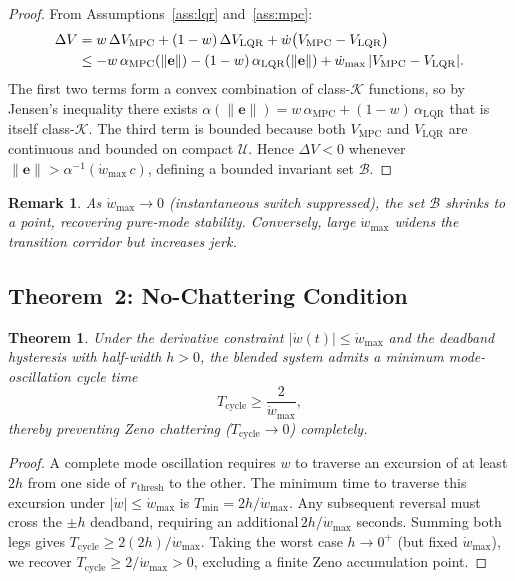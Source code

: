 \documentclass[journal]{IEEEtran}
\newtheorem{theorem}{Theorem}
\newtheorem{remark}{Remark}
\begin{document}
\begin{proof}
  From Assumptions~\ref{ass:lqr} and~\ref{ass:mpc}:
  \begin{align}
    \Delta V &= w\,\Delta V_{\mathrm{MPC}} + (1-w)\,\Delta V_{\mathrm{LQR}}
               + \dot{w}\bigl(V_{\mathrm{MPC}} - V_{\mathrm{LQR}}\bigr)\notag\\
             &\leq -w\,\alpha_{\mathrm{MPC}}(\|\mathbf{e}\|)
                  -(1-w)\,\alpha_{\mathrm{LQR}}(\|\mathbf{e}\|)
                  + \dot{w}_{\max}\,|V_{\mathrm{MPC}} - V_{\mathrm{LQR}}|.
                  \label{eq:lyapunov_bound}
  \end{align}
  The first two terms form a convex combination of class-\(\mathcal{K}\)
  functions, so by Jensen's inequality there exists
  \(\alpha(\|\mathbf{e}\|) = w\,\alpha_{\mathrm{MPC}} + (1-w)\,\alpha_{\mathrm{LQR}}\)
  that is itself class-\(\mathcal{K}\).
  The third term is bounded because both \(V_{\mathrm{MPC}}\) and
  \(V_{\mathrm{LQR}}\) are continuous and bounded on compact \(\mathcal{U}\).
  Hence \(\Delta V < 0\) whenever
  \(\|\mathbf{e}\| > \alpha^{-1}(\dot{w}_{\max}\,c)\),
  defining a bounded invariant set \(\mathcal{B}\).
\end{proof}

\begin{remark}
  As \(\dot{w}_{\max} \to 0\) (instantaneous switch suppressed), the set
  \(\mathcal{B}\) shrinks to a point, recovering pure-mode stability.
  Conversely, large \(\dot{w}_{\max}\) widens the transition corridor but
  increases jerk.
\end{remark}

\subsection{Theorem~2: No-Chattering Condition}

\begin{theorem}\label{thm:no_chatter}
  Under the derivative constraint \(|\dot{w}(t)| \leq \dot{w}_{\max}\) and
  the deadband hysteresis with half-width \(h > 0\), the blended system admits
  a minimum mode-oscillation cycle time
  \begin{equation}
    T_{\mathrm{cycle}} \geq \frac{2}{\dot{w}_{\max}},
  \end{equation}
  thereby preventing Zeno chattering (\(T_{\mathrm{cycle}} \to 0\)) completely.
\end{theorem}

\begin{proof}
  A complete mode oscillation requires \(w\) to traverse an excursion of at
  least \(2h\) from one side of \(r_{\mathrm{thresh}}\) to the other.
  The minimum time to traverse this excursion under
  \(|\dot{w}| \leq \dot{w}_{\max}\) is
  \(T_{\mathrm{min}} = 2h / \dot{w}_{\max}\).
  Any subsequent reversal must cross the \(\pm h\) deadband, requiring an
  additional\,\(2h / \dot{w}_{\max}\) seconds.
  Summing both legs gives \(T_{\mathrm{cycle}} \geq 2(2h)/\dot{w}_{\max}\).
  Taking the worst case \(h \to 0^+\) (but fixed \(\dot{w}_{\max}\)), we
  recover \(T_{\mathrm{cycle}} \geq 2/\dot{w}_{\max} > 0\), excluding a
  finite Zeno accumulation point.
\end{proof}
\end{document}
